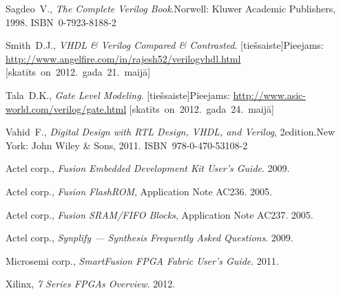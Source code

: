\documentclass[12pt,a4paper]{article} %
\begin{document}
{\begin{thebibliography}{9}
			Sagdeo~V.,
			\textit{The Complete Verilog Book}.\linebreak[2]
			Norwell: Kluwer Academic Publishers, 1998. ISBN~0-7923-8188-2
		
			Smith~D.J.,
			\textit{VHDL \& Verilog Compared \& Contrasted}. [tiešsaiste]\linebreak[2]
			Pieejams: \url{http://www.angelfire.com/in/rajesh52/verilogvhdl.html}
			\mbox{[skatīts on 2012.~gada 21.~maijā]}
		
			Tala~D.K., \textit{Gate Level Modeling}. [tiešsaiste]\linebreak[2]
			Pieejams: \url{http://www.asic-world.com/verilog/gate.html}
			\mbox{[skatīts on 2012.~gada 24.~maijā]}
		
			Vahid~F.,
			\textit{Digital Design with RTL Design, VHDL, and Verilog}, 2\nd edition.\linebreak[2]
			New York: %
			John Wiley \& Sons, 2011. ISBN~978-0-470-53108-2
		
			Actel corp.,
			\textit{Fusion Embedded Development Kit User's Guide}. %
			2009.
		
			Actel corp.,
			\textit{Fusion FlashROM}, Application Note AC236. %
			2005.
		
			Actel corp.,
			\textit{Fusion SRAM/FIFO Blocks}, Application Note AC237. %
			2005.
		
			Actel corp.,
			\textit{Synplify — Synthesis Frequently Asked Questions}. %
			2009.
		
			Microsemi corp.,
			\textit{SmartFusion FPGA Fabric User's Guide}.
			2011.
		
			Xilinx,
			\textit{7 Series FPGAs Overview}.
			2012.
	\end{thebibliography}
	} %
	
	\clearpage
	
	
	\clearpage
	\begin{appendices} %
	
	\end{appendices}
	
	\clearpage
	
	
	
\end{document}
